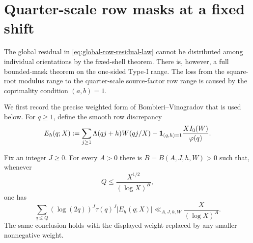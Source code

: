 \section{Quarter-scale row masks at a fixed shift}
\label{sec:quarter-mask-transfer}

The global residual in \eqref{eq:global-row-residual-law} cannot be
distributed among individual orientations by the fixed-shell theorem.
There is, however, a full bounded-mask theorem on the one-sided Type-I
range.  The loss from the square-root modulus range to the quarter-scale
source-factor row range is caused by the coprimality condition $(a,b)=1$.

We first record the precise weighted form of Bombieri--Vinogradov that is
used below.  For $q\geq1$, define the smooth row discrepancy
\begin{equation}
 E_h(q;X):=
 \sum_{j\geq1}\Lambda(qj+h)W(qj/X)
 -\mathbf 1_{(q,h)=1}\frac{XI_0(W)}{\varphi(q)}.
 \label{eq:smooth-row-discrepancy}
\end{equation}

\begin{lemma}
\label{lem:divisor-weighted-maximal-BV}
Fix an integer $J\geq0$.  For every $A>0$ there is
$B=B(A,J,h,W)>0$ such that, whenever
\begin{equation}
 Q\leq\frac{X^{1/2}}{(\log X)^B},
 \label{eq:weighted-BV-range}
\end{equation}
one has
\begin{equation}
 \sum_{q\leq Q}
 (\log(2q))^J\tau(q)^J|E_h(q;X)|
 \ll_{A,J,h,W}\frac{X}{(\log X)^A}.
 \label{eq:divisor-weighted-maximal-BV}
\end{equation}
The same conclusion holds with the displayed weight replaced by any
smaller nonnegative weight.
\end{lemma}

